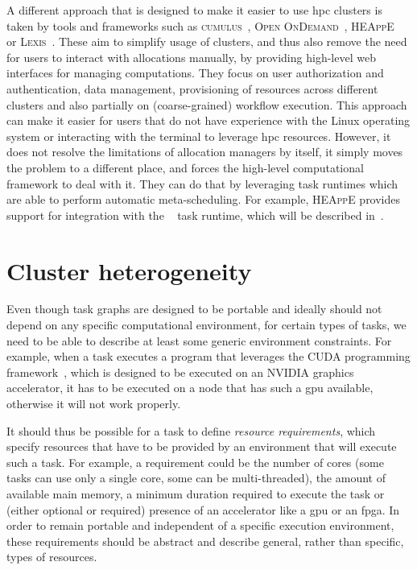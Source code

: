 A different approach that is designed to make it easier to use \gls{hpc} clusters is
taken by tools and frameworks such as \textsc{cumulus}~\cite{cumulus},
\textsc{Open OnDemand}~\cite{openondemand}, \textsc{HEAppE}~\cite{heappe} or
\textsc{Lexis}~\cite{lexis}. These aim to simplify usage of clusters, and thus
also remove the need for users to interact with allocations manually, by providing high-level web
interfaces for managing computations. They focus on user authorization and authentication, data
management, provisioning of resources across different clusters and also partially on
(coarse-grained) workflow execution. This approach can make it easier for users that do not have
experience with the Linux operating system or interacting with the terminal to leverage
\gls{hpc} resources. However, it does not resolve the limitations of allocation
managers by itself, it simply moves the problem to a different place, and forces the high-level
computational framework to deal with it. They can do that by leveraging task runtimes which are
able to perform automatic meta-scheduling. For example, \textsc{HEAppE} provides support
for integration with the \hyperqueue{}~\cite{heappe_hq} task runtime, which will
be described in~.

\section{Cluster heterogeneity}
\label{challenge:heterogeneity}
Even though task graphs are designed to be portable and ideally should not depend on any specific
computational environment, for certain types of tasks, we need to be able to describe at least some
generic environment constraints. For example, when a task executes a program that leverages the
CUDA programming framework~\cite{cuda}, which is designed to be executed on an NVIDIA
graphics accelerator, it has to be executed on a node that has such a \gls{gpu}
available, otherwise it will not work properly.

It should thus be possible for a task to define \emph{resource requirements}, which specify resources
that have to be provided by an environment that will execute such a task. For example, a
requirement could be the number of cores (some tasks can use only a single core, some can be
multi-threaded), the amount of available main memory, a minimum duration required to execute the
task or (either optional or required) presence of an accelerator like a \gls{gpu} or
an \gls{fpga}. In order to remain portable and independent of a specific execution
environment, these requirements should be abstract and describe general, rather than specific,
types of resources.

